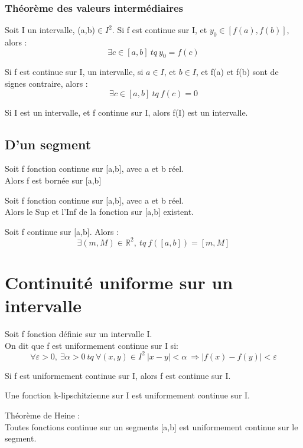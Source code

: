 \subsubsection{Théorème des valeurs intermédiaires}
\begin{prop}
Soit I un intervalle, (a,b)$\in I^2$. Si f est continue sur I, et $y_0 \in \left[f(a),f(b)\right]$, alors :
$$\exists c \in \left[a,b\right]~ tq~ y_0 = f(c) $$
\end{prop}
\begin{prop}
Si f est continue sur I, un intervalle, si $a \in I$, et $b \in I$, et f(a) et f(b) sont de signes contraire, alors : 
$$\exists c \in \left[a,b\right]~ tq~ f(c) = 0$$
\end{prop}
\begin{prop}
Si I est un intervalle, et f continue sur I, alors f(I) est un intervalle.
\end{prop}
\subsection{D'un segment}
\begin{prop}
Soit f fonction continue sur [a,b], avec a et b réel.\\
Alors f est bornée sur [a,b]
\end{prop}
\begin{prop}
Soit f fonction continue sur [a,b], avec a et b réel.\\
Alors le Sup et l'Inf de la fonction sur [a,b] existent.
\end{prop}
\begin{prop}
Soit f continue sur [a,b]. Alors : 
$$\exists (m,M) \in \mathbb{R}^2, ~tq~ f(\left[a,b\right]) = \left[m,M\right] $$
\end{prop}
\section{Continuité uniforme sur un intervalle}
\begin{de}
Soit f fonction définie sur un intervalle I.\\
On dit que f est uniformement continue sur I si: 
$$\forall \varepsilon > 0,~ \exists \alpha >0~ tq~ \forall (x,y) \in I^2~ |x-y| < \alpha~ \Rightarrow |f(x)-f(y)|<\varepsilon$$
\end{de}
\begin{prop}
Si f est uniformement continue sur I, alors f est continue sur I.
\end{prop}
\begin{prop}
Une fonction k-lipschitzienne sur I est uniformement continue sur I.
\end{prop}
\begin{theo}
Théorème de Heine :\\
Toutes fonctions continue sur un segments [a,b] est uniformement continue sur le segment.
\end{theo}
